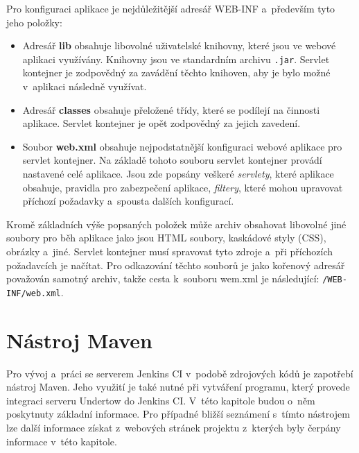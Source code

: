             Pro konfiguraci aplikace je nejdůležitější adresář WEB-INF a~především tyto jeho položky:

            \begin{itemize}
                \item Adresář \textbf{lib} obsahuje libovolné uživatelské knihovny, které jsou ve webové aplikaci využívány. 
                    Knihovny jsou ve standardním archivu \texttt{.jar}.
                    Servlet kontejner je zodpovědný za zavádění těchto knihoven, aby je bylo možné v~aplikaci následně využívat.

                \item Adresář \textbf{classes} obsahuje přeložené třídy, které se podílejí na činnosti aplikace. 
                    Servlet kontejner je opět zodpovědný za jejich zavedení. 

                \item Soubor \textbf{web.xml} obsahuje nejpodstatnější konfiguraci webové aplikace pro servlet kontejner.
                    Na základě tohoto souboru servlet kontejner provádí nastavené celé aplikace.
                    Jsou zde popsány veškeré \emph{servlety}, které aplikace obsahuje, pravidla pro zabezpečení aplikace,
                    \emph{filtery}, které mohou upravovat příchozí požadavky a~spousta dalších konfigurací. 
            \end{itemize}

            Kromě základních výše popsaných položek může archiv obsahovat libovolné jiné soubory pro běh aplikace jako jsou 
            HTML soubory, kaskádové styly (CSS), obrázky a~jiné. Servlet kontejner musí spravovat tyto zdroje
            a~při příchozích požadavcích je načítat. Pro odkazování těchto souborů je jako kořenový adresář považován
            samotný archiv, takže cesta k~souboru wem.xml je následující: \texttt{/WEB-INF/web.xml}.

            
         
    \section{Nástroj Maven} \label{maven}
        Pro vývoj a~práci se serverem Jenkins CI v~podobě zdrojových kódů je zapotřebí nástroj Maven. 
        Jeho využití je také nutné při vytváření programu, který provede integraci serveru Undertow do Jenkins CI. 
        V~této kapitole budou o~něm poskytnuty základní informace. Pro případné bližší
        seznámení s~tímto nástrojem lze další informace získat z~webových stránek projektu \cite{mavenWeb}
        z~kterých byly čerpány informace v~této kapitole. 
        

